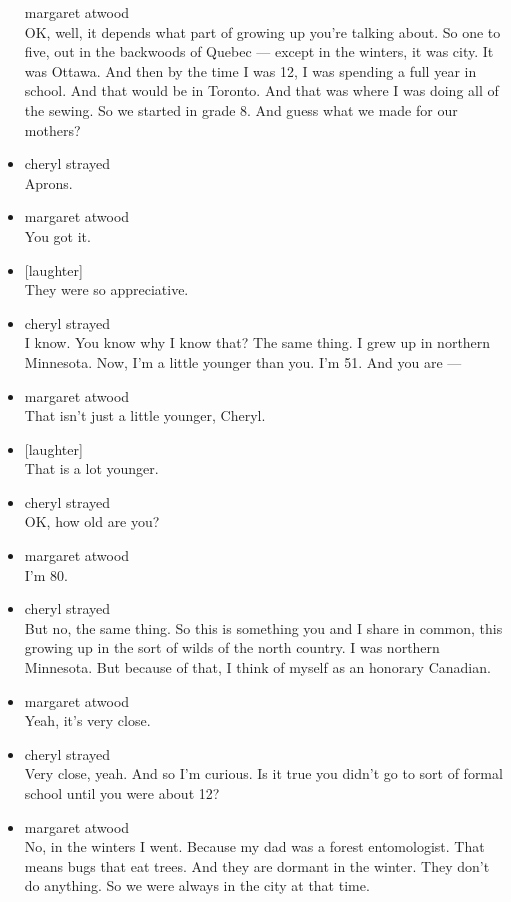 \begin{itemize}
  margaret atwood\\
  OK, well, it depends what part of growing up you're talking about. So
  one to five, out in the backwoods of Quebec --- except in the winters,
  it was city. It was Ottawa. And then by the time I was 12, I was
  spending a full year in school. And that would be in Toronto. And that
  was where I was doing all of the sewing. So we started in grade 8. And
  guess what we made for our mothers?
\item
  cheryl strayed\\
  Aprons.
\item
  margaret atwood\\
  You got it.
\item
  {[}laughter{]}\\
  They were so appreciative.
\item
  cheryl strayed\\
  I know. You know why I know that? The same thing. I grew up in
  northern Minnesota. Now, I'm a little younger than you. I'm 51. And
  you are ---
\item
  margaret atwood\\
  That isn't just a little younger, Cheryl.
\item
  {[}laughter{]}\\
  That is a lot younger.
\item
  cheryl strayed\\
  OK, how old are you?
\item
  margaret atwood\\
  I'm 80.
\item
  cheryl strayed\\
  But no, the same thing. So this is something you and I share in
  common, this growing up in the sort of wilds of the north country. I
  was northern Minnesota. But because of that, I think of myself as an
  honorary Canadian.
\item
  margaret atwood\\
  Yeah, it's very close.
\item
  cheryl strayed\\
  Very close, yeah. And so I'm curious. Is it true you didn't go to sort
  of formal school until you were about 12?
\item
  margaret atwood\\
  No, in the winters I went. Because my dad was a forest entomologist.
  That means bugs that eat trees. And they are dormant in the winter.
  They don't do anything. So we were always in the city at that time.

\end{itemize}
